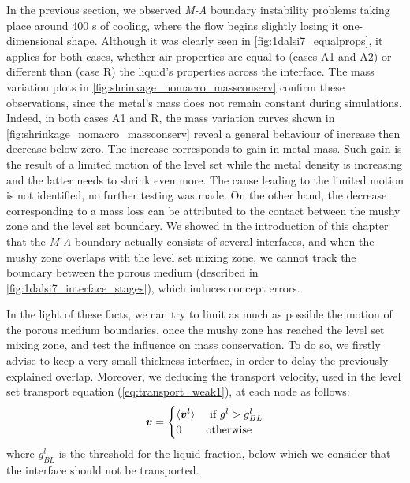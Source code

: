 In the previous section, we observed \emph{M-A} boundary instability problems taking place around 400 s of cooling, 
where the flow begins slightly losing it one-dimensional
shape. Although it was clearly seen in \cref{fig:1dalsi7_equalprops}, it applies
for both cases, whether air properties are equal to (cases A1 and A2) or different than (case R) the liquid's properties across the interface. 
The mass variation plots in \cref{fig:shrinkage_nomacro_massconserv} confirm these observations, since the metal's mass does not remain 
constant during simulations. Indeed, in both cases A1 and R, the mass variation curves shown in \cref{fig:shrinkage_nomacro_massconserv} reveal
a general behaviour of increase then decrease below zero. The increase corresponds to gain in metal mass.
Such gain is the result of a limited motion of the level set while the metal density is increasing and the latter needs to shrink even more.
The cause leading to the limited motion is not identified, no further testing was made.
On the other hand, the decrease corresponding to a mass loss can be attributed to the
contact between the mushy zone and the level set boundary. 
We showed in the introduction of this chapter that the \emph{M-A} boundary actually consists of several interfaces, 
and when the mushy zone overlaps with the level set mixing zone, we cannot track the boundary between the porous medium 
(described in \cref{fig:1dalsi7_interface_stages}), which induces concept errors.

In the light of these facts, we can try to limit as much as possible the motion of the porous medium boundaries, 
once the mushy zone has reached the level set mixing zone,
and test the influence on mass conservation.
To do so, we firstly advise to keep a very small thickness interface, in order to delay the previously explained overlap. Moreover, we deducing the 
transport velocity, used in the level set transport equation (\cref{eq:transport_weak1}), at each node as follows:
\begin{align}
\label{eq:}
\boldsymbol{v} =
\begin{cases}
  \langle \boldsymbol{v^l} \rangle		& \text{ if } g^l > g_{BL}^l \\
  0 		& \text{otherwise}
\end{cases}
\end{align}
where $g_{BL}^l$ is the threshold for the liquid fraction, below which we consider that the interface should not be transported.

